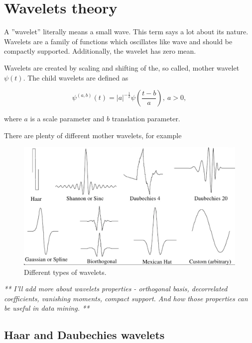 \chapter{Wavelets theory}
A ''wavelet'' literally means a small wave. This term says a lot about its nature. Wavelets are a family of functions which oscillates like wave and should be compactly supported. Additionally, the wavelet has zero mean.

\begin{defn}
Wavelets are created by scaling and shifting of the, so called, mother wavelet $\psi(t)$. The child wavelets are defined as

\begin{equation}
\label{eq:wavelets}
\psi^{(a,b)}(t)=|a|^{-\frac{1}{2}} \psi\left(\frac{t-b}{a}\right),\ a>0,
\end{equation}

where $a$ is a scale parameter and $b$ translation parameter.

\end{defn}

There are plenty of different mother wavelets, for example

\begin{figure}[h]
	\centering
	\includegraphics[width=\textwidth]{wavelets_with_bottom_line.png}
	\caption{Different types of wavelets.}
	\label{fig:wavelets}
\end{figure}

\textit{** I'll add more about wavelets properties - orthogonal basis, decorrelated coefficients, vanishing moments, compact support. And how those properties can be useful in data mining. **}


\section{Haar and Daubechies wavelets}

